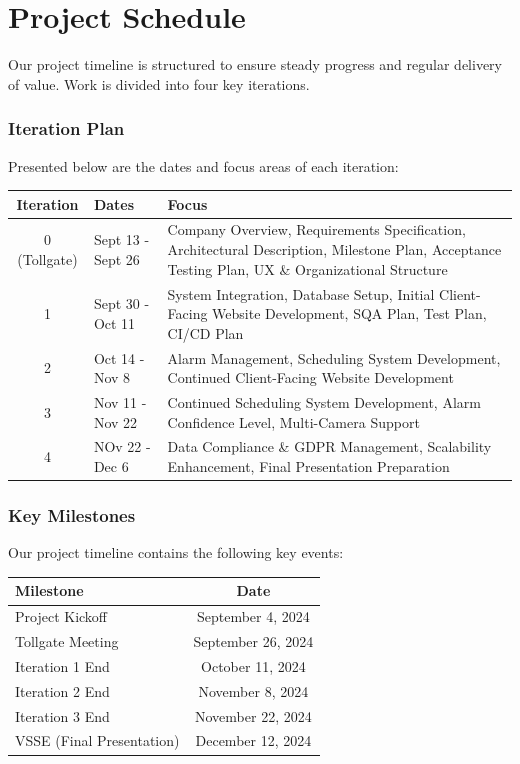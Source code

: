\section{Project Schedule}

Our project timeline is structured to ensure steady progress and regular delivery of value. Work is divided into four key iterations.

\subsubsection{Iteration Plan}
Presented below are the dates and focus areas of each iteration: 
\begin{center}
    \begin{tabular}{|c|l|l|}
        \hline
        \textbf{Iteration} & \textbf{Dates} & \textbf{Focus} \\
        \hline
        0 (Tollgate) & Sept 13 - Sept 26 & Company Overview, Requirements Specification, Architectural Description, Milestone Plan, Acceptance Testing Plan, UX \& Organizational Structure \\
        \hline
        1 & Sept 30 - Oct 11 & System Integration, Database Setup, Initial Client-Facing Website Development, SQA Plan, Test Plan, CI/CD Plan \\
        \hline
        2 & Oct 14 - Nov 8 & Alarm Management, Scheduling System Development, Continued Client-Facing Website Development \\
        \hline
        3 & Nov 11 - Nov 22 & Continued Scheduling System Development, Alarm Confidence Level, Multi-Camera Support \\
        \hline
        4 & NOv 22 - Dec 6 & Data Compliance \& GDPR Management, Scalability Enhancement, Final Presentation Preparation \\
        \hline
    \end{tabular}
    \end{center}


\subsubsection{Key Milestones}

Our project timeline contains the following key events:

\begin{center}
\begin{tabular}{|l|c|}
    \hline
    \textbf{Milestone} & \textbf{Date} \\
    \hline
    Project Kickoff & September 4, 2024 \\
    Tollgate Meeting & September 26, 2024 \\
    Iteration 1 End & October 11, 2024 \\
    Iteration 2 End & November 8, 2024 \\
    Iteration 3 End & November 22, 2024 \\
    VSSE (Final Presentation) & December 12, 2024 \\
    \hline
\end{tabular}
\end{center}


